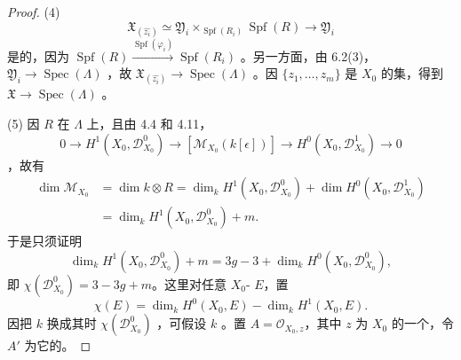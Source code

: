 \begin{proof}
(4) 
\[
\mathfrak X_{(\widehat{z_i})}\simeq\mathfrak Y_i\times_{\operatorname{Spf}(R_i)}\operatorname{Spf}(R)
 \longrightarrow\mathfrak Y_i
\]
是的，因为 $\operatorname{Spf}(R)\xrightarrow{\operatorname{Spf}(\varphi_i)}\operatorname{Spf}(R_i)$ 。另一方面，由 6.2(3)，$\mathfrak Y_i\to\operatorname{Spec}(\Lambda)$ ，故 $\mathfrak X_{(\widehat{z_i})}\to\operatorname{Spec}(\Lambda)$ 。因 $\{z_1,\ldots,z_m\}$ 是 $X_0$ 的集，得到 $\mathfrak X\to\operatorname{Spec}(\Lambda)$ 。

(5) 因 $R$ 在 $\Lambda$ 上，且由 4.4 和 4.11，
\[
0\longrightarrow H^1(X_0,\mathcal D_{X_0}^0)
 \longrightarrow[\mathcal M_{X_0}(k[\epsilon])]
 \longrightarrow H^0(X_0,\mathcal D_{X_0}^1)\longrightarrow0
\]
，故有
\[
\begin{aligned}
\dim\mathcal M_{X_0}
 &=\dim k\otimes R
 =\dim_k H^1(X_0,\mathcal D_{X_0}^0)+\dim H^0(X_0,\mathcal D_{X_0}^1)\\
 &=\dim_k H^1(X_0,\mathcal D_{X_0}^0)+m.
\end{aligned}
\]
于是只须证明
\[
\dim_k H^1(X_0,\mathcal D_{X_0}^0)+m
 =3g-3+\dim_k H^0(X_0,\mathcal D_{X_0}^0),
\]
即 $\chi(\mathcal D_{X_0}^0)=3-3g+m$。这里对任意 $X_0$- $E$，置
\[
\chi(E)=\dim_k H^0(X_0,E)-\dim_k H^1(X_0,E).
\]
因把 $k$ 换成其时 $\chi(\mathcal D_{X_0}^0)$ ，可假设 $k$ 。置 $A=\mathcal O_{X_0,z}$，其中 $z$ 为 $X_0$ 的一个，令 $A'$ 为它的。


\end{proof}
